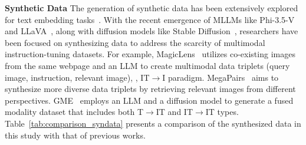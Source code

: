 \noindent \textbf{Synthetic Data} The generation of synthetic data has been extensively explored for text embedding tasks~\cite{E5mistral, speed, glan}.
With the recent emergence of MLLMs like Phi-3.5-V~\cite{Phi3} and LLaVA~\cite{Llava}, along with diffusion models like Stable Diffusion~\cite{diffusion}, researchers have been focused on synthesizing data to address the scarcity of multimodal instruction-tuning datasets.
For example, MagicLens~\cite{MagicLens} utilizes co-existing images from the same webpage and an LLM to create multimodal data triplets (query image, instruction, relevant image), \ie, IT$\rightarrow$I paradigm.
MegaPairs~\cite{megapairs} aims to synthesize more diverse data triplets by retrieving relevant images from different perspectives.
GME~\cite{GME} employs an LLM and a diffusion model to generate a fused modality dataset that includes both T$\rightarrow$IT and IT$\rightarrow$IT types.
Table~\ref{tab:comparison_syndata} presents a comparison of the synthesized data in this study with that of previous works.
